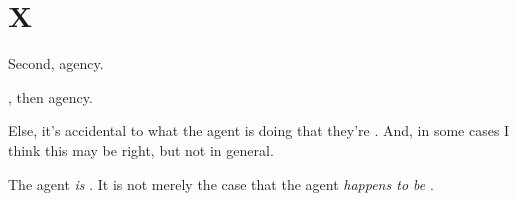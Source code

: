 \section{X}
\label{sec:x}

\begin{note}
  Second, agency.

  \tCV{}, then agency.

  Else, it's accidental to what the agent is doing that they're \tCV{}.
  And, in some cases I think this may be right, but not in general.

  The agent \emph{is} \tCV{}.
  It is not merely the case that the agent \emph{happens to be} \tCV{}.
\end{note}









